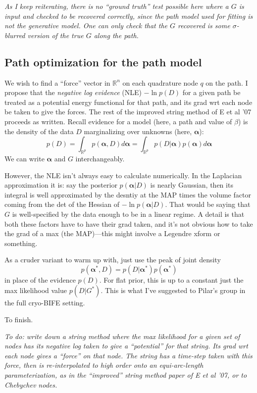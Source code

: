 \documentclass[10pt]{article}
\newcommand{\be}{\begin{equation}}
\newcommand{\ee}{\end{equation}}
\newcommand{\R}{\mathbb{R}}
\newcommand{\bt}{\beta}
\newcommand{\bal}{{\bm\alpha}}
\begin{document}
{\em 
As I keep reiterating, there is no ``ground truth'' test possible here
where a $G$ is input and checked to be recovered correctly,
since the path model used for fitting is not the generative model.
One can only check that the $G$ recovered is some $\sigma$-blurred version
of the true $G$ along the path.
}



\subsection{Path optimization for the path model}

We wish to find a ``force'' vector in $\R^n$ on each quadrature node $q$ on the path.
I propose that the {\em negative log evidence} (NLE) $-\ln p(D)$ for a given
path be treated as a potential energy functional for that path,
and its grad wrt each node be taken to give the forces.
The rest of the improved string method of E et al '07 proceeds as written.
Recall evidence for a model (here, a path and value of $\bt$) is
the density of the data $D$ marginalizing over unknowns (here, $\bal$):
\be
p(D) = \int_{\R^p} p(\bal,D) d\bal = \int_{\R^p} p(D|\bal) p(\bal) d\bal
\ee
We can write $\bal$ and $G$ interchangeably.

However, the NLE isn't always easy to calculate numerically.
In the Laplacian approximation it is: say the posterior $p(\bal|D)$ is
nearly Gaussian, then its integral is well approximated by the
desntiy at the MAP times the volume factor coming from the det of the
Hessian of $-\ln p(\bal|D)$.
That would be saying that $G$ is well-specified by the data enough to
be in a linear regime.
A detail is that both these factors have to have their grad taken,
and it's not obvious how to take the grad of a max (the MAP)---this might
involve a Legendre xform or something.

As a cruder variant to warm up with, just use the peak of joint density
$$
p(\bal^\ast,D) = p(D|\bal^\ast) p(\bal^\ast)
$$
in place of the evidence $p(D)$.
For flat prior, this is up to a constant
just the max likelihood value $p(D|G^\ast)$.
This is what I've suggested to Pilar's group in the full cryo-BIFE setting.

To finish.

{\em To do: write down a string method where the max likelihood for a given
  set of nodes has its negative log taken to give a ``potential'' for that string. Its grad wrt each node gives a ``force'' on that node. The string has a time-step taken with this force, then is re-interpolated to high order onto an equi-arc-length parameterization, as in the ``improved'' string method paper of E et al '07, or to Chebychev nodes.}
\end{document}
